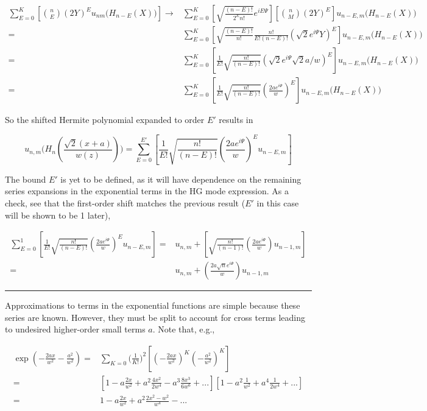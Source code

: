 \documentclass[aps,twoside,secnumarabic,balancelastpage,amsmath,amssymb,nofootinbib,hyperref=pdftex]{revtex4}
\begin{document}
\begin{align*}
\sum_{E=0}^K
\left[
{n \choose E}
(2Y)^E
 u_{nm}\Big(H_{n-E}(X) \Big) 
\right]
	\rightarrow & 
	\sum_{E=0}^K
		[
		\sqrt{\frac{(n-E)!}{2^E n!}}
		e^{iE\Psi}
		]
		[
		{n \choose M}
		(2Y)^E
				]
		u_{n-E,m}\Big(H_{n-E}(X) \Big)
		\\=&
			\sum_{E=0}^K
		[
		\sqrt{\frac{(n-E)!}{n!}}
		\frac{n!}{E!(n-E)!}
		( \sqrt{2} e^{i\Psi} Y)^E
				]
		u_{n-E,m}\Big(H_{n-E}(X) \Big)
		\\ = &
			\sum_{E=0}^K
		[
		\frac{1}{E!}
		\sqrt{\frac{n!}{(n-E)!}}
		( \sqrt{2} e^{i\Psi} \sqrt{2}a/w)^E
				]
		u_{n-E,m}\Big(H_{n-E}(X) \Big)
		\\ = &
			\sum_{E=0}^K
		[
		\frac{1}{E!}
		\sqrt{\frac{n!}{(n-E)!}}
		(
		 \frac{2 a e^{i\Psi}}{w}
		)^E
				]
		u_{n-E,m}\Big(H_{n-E}(X) \Big)		
\end{align*}

So the shifted Hermite polynomial expanded to order $E'$ results in

\begin{equation}\label{TH:herm}
 u_{n,m} \Big( H_n(\frac{\sqrt{2}(x+a)}{w(z)})
 \Big) =
			\sum_{E=0}^{E'}
		[
		\frac{1}{E!}
		\sqrt{\frac{n!}{(n-E)!}}
		(
		 \frac{2 a e^{i\Psi}}{w}
		)^E
		u_{n-E,m}
		]	
\end{equation}

The bound $E'$ is yet to be defined, as it will have dependence on the remaining series expansions in the exponential terms in the HG mode expression. As a check, see that the first-order shift  matches the previous result ($E'$ in this case will be shown to be 1 later),

\begin{align*}
			\sum_{E=0}^1
		[
		\frac{1}{E!}
		\sqrt{\frac{n!}{(n-E)!}}
		(
		 \frac{2 a e^{i\Psi}}{w}
		)^E
		u_{n-E,m}
		]	
		=&
		u_{n,m}
		+
		[
		\sqrt{\frac{n!}{(n-1)!}}
		(
		 \frac{2 a e^{i\Psi}}{w}
		)	
		u_{n-1,m}
		]
		\\	=&
		u_{n,m}
		+
		(
		 \frac{2 a \sqrt{n} e^{i\Psi}}{w}
		)	
		u_{n-1,m}
\end{align*}

\rule{\textwidth}{0.4pt}

Approximations to terms in the exponential functions are simple because these series are known. However, they must be split to account for cross terms leading to undesired higher-order small terms $a$. Note that, e.g.,

\begin{align*}
\exp(-\frac{2ax}{w^2}-\frac{a^2}{w^2})
=&
\sum_{K=0}
	\Big(\frac{1}{K!} \Big)^2
\left[
	(-\frac{2ax}{w^2})^K
	(-\frac{a^2}{w^2})^K		
\right]
\\=&
[
1 -
a\frac{2x}{w^2}
+
a^2 \frac{4x^2}{2w^4}
-
a^3 \frac{8x^3}{6w^6}
+...
]
[
1
-
a^2\frac{1}{w^2}
+
a^4 \frac{1}{2w^4}
+ ...
]
\\=&
1
-
a\frac{2x}{w^2}
+
a^2
\frac{2x^2-w^2}{w^4}
-
...
\end{align*}
\end{document}
